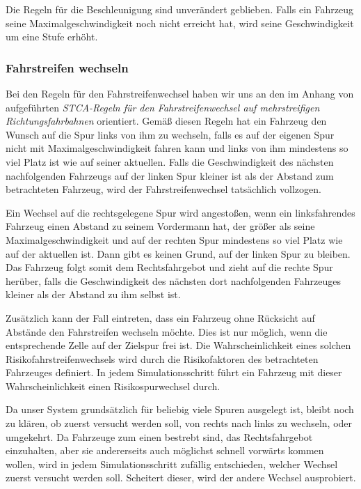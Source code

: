 \documentclass[10pt, a4paper]{article}
\newcommand\q[1]{\glqq{}#1\grqq{}}
\begin{document}
Die Regeln für die Beschleunigung sind unverändert geblieben. Falls ein Fahrzeug seine Maximalgeschwindigkeit noch nicht erreicht hat, wird seine Geschwindigkeit um eine Stufe erhöht.

\subsubsection{Fahrstreifen wechseln}
\label{subsubsec:fahrstreifenWechseln}

Bei den Regeln für den Fahrstreifenwechsel haben wir uns an den im Anhang von \cite{mehrspurig} aufgeführten \emph{\q{STCA-Regeln für den Fahrstreifenwechsel auf mehrstreifigen Richtungsfahrbahnen}} orientiert. Gemäß diesen Regeln hat ein Fahrzeug den Wunsch auf die Spur links von ihm zu wechseln, falls es auf der eigenen Spur nicht mit Maximalgeschwindigkeit fahren kann und links von ihm mindestens so viel Platz ist wie auf seiner aktuellen. Falls die Geschwindigkeit des nächsten nachfolgenden Fahrzeugs auf der linken Spur kleiner ist als der Abstand zum betrachteten Fahrzeug, wird der Fahrstreifenwechsel tatsächlich vollzogen.

Ein Wechsel auf die rechtsgelegene Spur wird angestoßen, wenn ein linksfahrendes Fahrzeug einen Abstand zu seinem Vordermann hat, der größer als seine Maximalgeschwindigkeit und auf der rechten Spur mindestens so viel Platz wie auf der aktuellen ist. Dann gibt es keinen Grund, auf der linken Spur zu bleiben. Das Fahrzeug folgt somit dem Rechtsfahrgebot und zieht auf die rechte Spur herüber, falls die Geschwindigkeit des nächsten dort nachfolgenden Fahrzeuges kleiner als der Abstand zu ihm selbst ist.

Zusätzlich kann der Fall eintreten, dass ein Fahrzeug ohne Rücksicht auf Abstände den Fahrstreifen wechseln möchte. Dies ist nur möglich, wenn die entsprechende Zelle auf der Zielspur frei ist. Die Wahrscheinlichkeit eines solchen Risikofahrstreifenwechsels wird durch die Risikofaktoren des betrachteten Fahrzeuges definiert. In jedem Simulationsschritt führt ein Fahrzeug mit dieser Wahrscheinlichkeit einen Risikospurwechsel durch.

Da unser System grundsätzlich für beliebig viele Spuren ausgelegt ist, bleibt noch zu klären, ob zuerst versucht werden soll, von rechts nach links zu wechseln, oder umgekehrt. Da Fahrzeuge zum einen bestrebt sind, das Rechtsfahrgebot einzuhalten, aber sie andererseits auch möglichst schnell vorwärts kommen wollen, wird in jedem Simulationsschritt zufällig entschieden, welcher Wechsel zuerst versucht werden soll. Scheitert dieser, wird der andere Wechsel ausprobiert.
\end{document}
